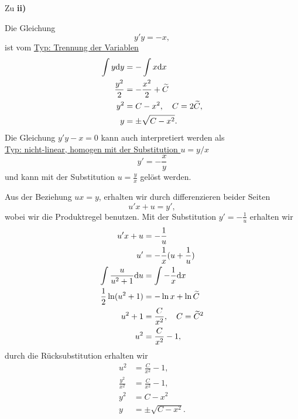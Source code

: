 {\begin{itemize}
Zu \textbf{ii)}

Die Gleichung
$$
y'y = -x,
$$
ist vom \underline{Typ: Trennung der Variablen}
\begin{align*}
\int y \mathrm{d} y &= -\int x \mathrm{d} x\\
\frac{y^2}{2} &= -\frac{x^2}{2}+\widetilde C\\
y^2 &= C-x^2, \quad C = 2\widetilde C,\\
y &= \pm \sqrt{C-x^2}.
\end{align*}
Die Gleichung $y'y-x=0$ kann auch interpretiert werden als\\
\underline{Typ: nicht-linear, homogen mit der Substitution $u=y/x$}
$$
y' = -\frac{x}{y}
$$ 
und kann mit der Substitution $u=\frac{y}{x}$ gelöst werden.

Aus der Beziehung $ux = y$, erhalten wir durch differenzieren beider Seiten
$$
u' x + u = y',
$$
wobei wir die Produktregel benutzen.
Mit der Substitution $y'=-\frac{1}{u}$ erhalten wir
\begin{align*}
u'x + u &= - \frac{1}{u}\\
u' &= -\frac{1}{x} (u+\frac{1}{u})\\
\int \frac{u}{u^2+1}\mathrm{d} u &= \int -\frac{1}{x}\mathrm{d} x\\
\frac{1}{2}\ln (u^2+1) &= -\ln x + \ln \widetilde C\\
u^2+1 &= \frac{C}{x^2}, \quad C=\widetilde C^2\\
u^2 &= \frac{C}{x^2}-1,
\end{align*}
durch die Rücksubstitution erhalten wir
\begin{align*}
u^2 &= \frac{C}{x^2}-1,\\
\frac{y^2}{x^2} &= \frac{C}{x^2}-1,\\
y^2 & = C -x^2\\
y&=\pm \sqrt{C-x^2}.
\end{align*}


\end{itemize}}
